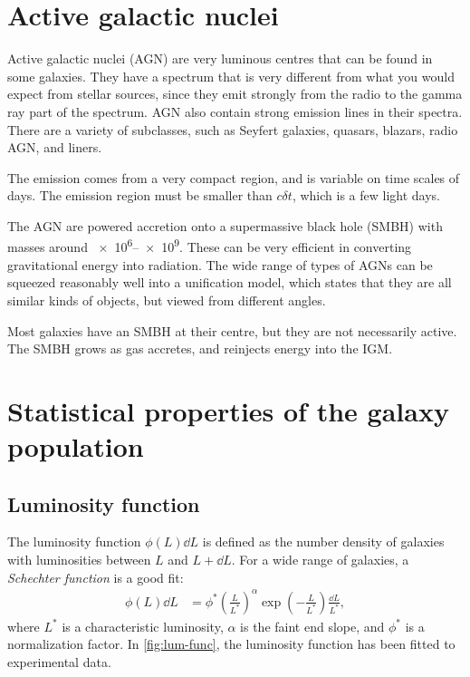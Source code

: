 \section{Active galactic nuclei}
Active galactic nuclei (AGN) are very luminous centres that can be found in some galaxies.
They have a spectrum that is very different from what you would expect from stellar sources, since they emit strongly from the radio to the gamma ray part of the spectrum.
AGN also contain strong emission lines in their spectra.
There are a variety of subclasses, such as Seyfert galaxies, quasars, blazars, radio AGN, and liners.

The emission comes from a very compact region, and is variable on time scales of days.
The emission region must be smaller than $c \delta t$, which is a few light days.

The AGN are powered accretion onto a supermassive black hole (SMBH) with masses around \SIrange{e6}{e9}{\solarmass}.
These can be very efficient in converting gravitational energy into radiation.
The wide range of types of AGNs can be squeezed reasonably well into a unification model, which states that they are all similar kinds of objects, but viewed from different angles.

Most galaxies have an SMBH at their centre, but they are not necessarily active.
The SMBH grows as gas accretes, and reinjects energy into the IGM.

\section{Statistical properties of the galaxy population}

\subsection{Luminosity function}
The luminosity function $\phi(L) \dd{L}$ is defined as the number density of galaxies with luminosities between $L$ and $L + \dd{L}$.
For a wide range of galaxies, a \emph{Schechter function} is a good fit:
\begin{align*}
	\phi(L) \dd{L}
	&= \phi^* \left( \frac{L}{L^*} \right)^\alpha
	\exp\left( - \frac{L}{L^*} \right)
	\frac{\dd{L}}{L^*},
\end{align*}
where
$L^*$ is a characteristic luminosity,
$\alpha$ is the faint end slope,
and $\phi^*$ is a normalization factor.
In \cref{fig:lum-func}, the luminosity function has been fitted to experimental data.

